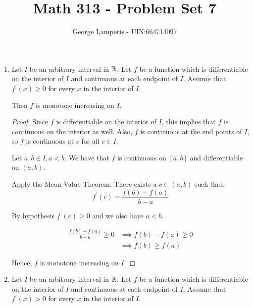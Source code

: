 \documentclass[12pt, letterpaper]{article}
\begin{document}
\title{Math 313 - Problem Set 7\vspace{-2ex}}   %
\author{George Lamperis - UIN:664714097}        
\date{\vspace{-2ex}}
\maketitle


\begin{enumerate}[label=\bfseries1\alph*)]

\item Let $I$ be an arbitrary interval in $\mathbb{R}$. Let $f$ be a function which is 
differentiable on the interior of $I$ and continuous at each endpoint of $I$. 
Assume that $f^\prime(x) \geq 0$ for every $x$ in the interior of $I$. 

Then $f$ is monotone increasing on $I$.

\begin{proof}
    Since $f$ is differentiable on the interior of $I$, this implies that $f$ is 
    continuous on the interior as well. Also, $f$ is continuous at the end points
    of $I$, so $f$ is continuous at $c$ for all $c \in I$.

    Let $a,b \in I, a<b$. We have that $f$ is continuous on $[a,b]$ and 
    differentiable on $(a,b)$. 

    Apply the Mean Value Theorem. There exists a $c \in (a,b)$ such that:
    \[f^\prime(c) = \frac{f(b) - f(a)}{b-a} \]

    By hypothesis $f^\prime (c) \geq 0$ and we also have $a < b$.

    \begin{align*}
        \frac{f(b) - f(a)}{b-a} \geq 0 &\implies f(b)-f(a) \geq 0 \\
                                       &\implies f(b) \geq f(a)
    \end{align*}

    Hence, $f$ is monotone increasing on $I$.
\end{proof}


\item Let $I$ be an arbitrary interval in $\mathbb{R}$. Let $f$ be a function which is 
differentiable on the interior of $I$ and continuous at each endpoint of $I$. 
Assume that $f^\prime(x) > 0$ for every $x$ in the interior of $I$. 


\end{enumerate}
\end{document}
